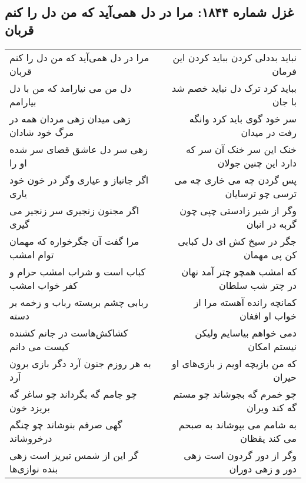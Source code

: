 \begin{center}
\section*{غزل شماره ۱۸۴۴: مرا در دل همی‌آید که من دل را کنم قربان}
\label{sec:1844}
\begin{longtable}{l p{0.5cm} r}
مرا در دل همی‌آید که من دل را کنم قربان
&&
نباید بددلی کردن بباید کردن این فرمان
\\
دل من می نیارامد که من با دل بیارامم
&&
بباید کرد ترک دل نباید خصم شد با جان
\\
زهی میدان زهی مردان همه در مرگ خود شادان
&&
سر خود گوی باید کرد وانگه رفت در میدان
\\
زهی سر دل عاشق قضای سر شده او را
&&
خنک این سر خنک آن سر که دارد این چنین جولان
\\
اگر جانباز و عیاری وگر در خون خود یاری
&&
پس گردن چه می خاری چه می ترسی چو ترسایان
\\
اگر مجنون زنجیری سر زنجیر می گیری
&&
وگر از شیر زادستی چپی چون گربه در انبان
\\
مرا گفت آن جگرخواره که مهمان توام امشب
&&
جگر در سیخ کش ای دل کبابی کن پی مهمان
\\
کباب است و شراب امشب حرام و کفر خواب امشب
&&
که امشب همچو چتر آمد نهان در چتر شب سلطان
\\
ربابی چشم بربسته رباب و زخمه بر دسته
&&
کمانچه رانده آهسته مرا از خواب او افغان
\\
کشاکش‌هاست در جانم کشنده کیست می دانم
&&
دمی خواهم بیاسایم ولیکن نیستم امکان
\\
به هر روزم جنون آرد دگر بازی برون آرد
&&
که من بازیچه اویم ز بازی‌های او حیران
\\
چو جامم گه بگرداند چو ساغر گه بریزد خون
&&
چو خمرم گه بجوشاند چو مستم گه کند ویران
\\
گهی صرفم بنوشاند چو چنگم درخروشاند
&&
به شامم می بپوشاند به صبحم می کند یقظان
\\
گر این از شمس تبریز است زهی بنده نوازی‌ها
&&
وگر از دور گردون است زهی دور و زهی دوران
\\
\end{longtable}
\end{center}
